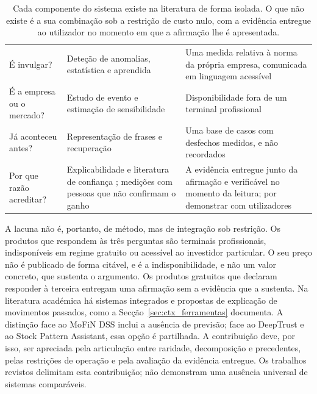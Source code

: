 \begin{table}[!htbp]
\caption[Posicionamento do trabalho face à literatura]{Cada componente do sistema existe na
literatura de forma isolada. O que não existe é a sua combinação sob a restrição de custo nulo, com
a evidência entregue ao utilizador no momento em que a afirmação lhe é apresentada.}
\label{tab:ctx_posicionamento}
\centering
\small
\begin{tabular}{L{0.24\textwidth} L{0.30\textwidth} L{0.34\textwidth}}
\toprule
{} &  &  \\
\midrule
É invulgar?
  & Deteção de anomalias, estatística e aprendida \autocite{chandola2009anomaly, liu2008isolation}
  & Uma medida relativa à norma da própria empresa, comunicada em linguagem acessível \\
\addlinespace
É a empresa ou o mercado?
  & Estudo de evento e estimação de sensibilidade \autocite{brown1985daily, vasicek1973beta}
  & Disponibilidade fora de um terminal profissional \\
\addlinespace
Já aconteceu antes?
  & Representação de frases e recuperação \autocite{reimers2019sbert, manning2008ir}
  & Uma base de casos com desfechos medidos, e não recordados \\
\addlinespace
Por que razão acreditar?
  & Explicabilidade e literatura de confiança \autocite{rudin2019stop, lee2004trust}; medições
    com pessoas que não confirmam o ganho \autocite{waa2021xai, cau2023logicstyle,
    bertrand2023featurebased}
  & A evidência entregue junto da afirmação e verificável no momento da leitura; por
    demonstrar com utilizadores \\
\bottomrule
\end{tabular}
\end{table}

A lacuna não é, portanto, de método, mas de integração sob restrição. Os produtos que respondem às três perguntas são terminais profissionais, indisponíveis em regime
gratuito ou acessível ao investidor particular. O seu preço não é publicado de forma citável, e é
a indisponibilidade, e não um valor concreto, que sustenta o argumento. Os produtos
gratuitos que declaram responder à terceira entregam uma afirmação sem a evidência que a sustenta.
Na literatura académica há sistemas integrados e propostas de explicação de movimentos passados,
como a Secção~\ref{sec:ctx_ferramentas} documenta. A distinção face ao MoFiN DSS inclui a ausência
de previsão; face ao DeepTrust e ao Stock Pattern Assistant, essa opção é partilhada. A
contribuição deve, por isso, ser apreciada pela articulação entre raridade, decomposição e
precedentes, pelas restrições de operação e pela avaliação da evidência entregue. Os trabalhos
revistos delimitam esta contribuição; não demonstram uma ausência universal de sistemas comparáveis.

